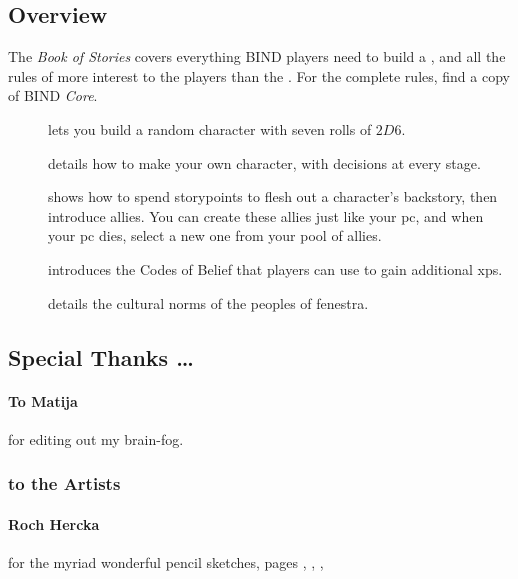\begin{multicols}{2}

\subsection*{Overview}

The \textit{Book of Stories} covers everything BIND players need to build a , and all the rules of more interest to the players than the .
For the complete rules, find a copy of BIND \textit{Core}.

\begin{description}
  \item[]
  lets you build a random character with seven rolls of $2D6$.
  \item[]
  details how to make your own character, with decisions at every stage.
  \item[] shows how to spend \glspl{storypoint} to flesh out a character's backstory, then introduce allies.
  You can create these allies just like your \gls{pc}, and when your \gls{pc} dies, select a new one from your pool of allies.
  \item[] introduces the Codes of Belief that players can use to gain additional \glspl{xp}.
  \item[] details the cultural norms of the peoples of \gls{fenestra}.
\end{description}

\columnbreak

\subsection*{Special Thanks \ldots}

\paragraph{To Matija}
for editing out my brain-fog.

\subsubsection*{to the Artists}

\paragraph{Roch Hercka} for the myriad wonderful pencil sketches, pages 
\pageref{Roch_Hercka/five_races}, 
\pageref{Roch_Hercka/xp-1}, 
\pageref{Roch_Hercka/xp-2}, 


\end{multicols}

